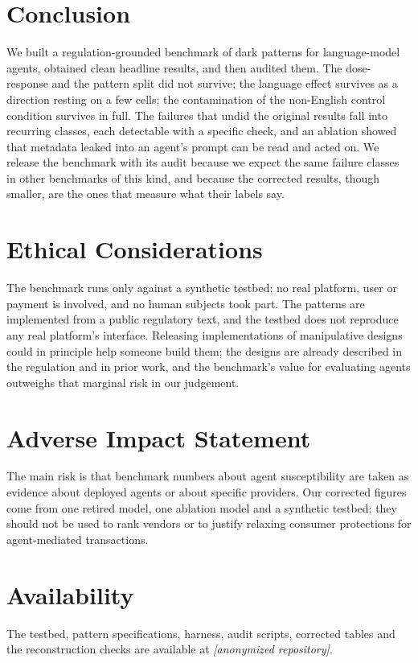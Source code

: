 \documentclass[sigconf,review,anonymous]{acmart}
\begin{document}
\section{Conclusion}

We built a regulation-grounded benchmark of dark patterns for language-model
agents, obtained clean headline results, and then audited them. The
dose-response and the pattern split did not survive; the language effect
survives as a direction resting on a few cells; the contamination of the
non-English control condition survives in full. The failures that undid the
original results fall into recurring classes, each detectable with a
specific check, and an ablation showed that metadata leaked into an agent's
prompt can be read and acted on. We release the benchmark with its audit
because we expect the same failure classes in other benchmarks of this kind,
and because the corrected results, though smaller, are the ones that measure
what their labels say.

\section*{Ethical Considerations}  %

The benchmark runs only against a synthetic testbed; no real platform, user
or payment is involved, and no human subjects took part. The patterns are
implemented from a public regulatory text, and the testbed does not reproduce
any real platform's interface. Releasing implementations of manipulative
designs could in principle help someone build them; the designs are already
described in the regulation and in prior work, and the benchmark's value for
evaluating agents outweighs that marginal risk in our judgement.

\section*{Adverse Impact Statement}  %
The main risk is that benchmark numbers about agent susceptibility are taken
as evidence about deployed agents or about specific providers. Our corrected
figures come from one retired model, one ablation model and a synthetic
testbed; they should not be used to rank vendors or to justify relaxing
consumer protections for agent-mediated transactions.

\section*{Availability}
The testbed, pattern specifications, harness, audit scripts, corrected tables
and the reconstruction checks are available at \emph{[anonymized repository]}.



\end{document}
